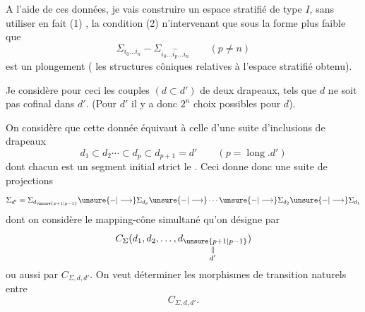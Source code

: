 
A l'aide de ces données, je vais
construire un espace stratifié de type \(I\),
sans utiliser en fait 
(1) , la condition (2) n'intervenant
que sous la forme plus faible que
\[
 \Sigma_{i_0\ldots i_n}
 -\Sigma_{i_0\ldots\widehat{i_p}\ldots i_n}\qquad(p\ne n)
\]
est un plongement 
( les structures côniques
relatives à l'espace stratifié obtenu).

Je considère pour ceci les couples
 \((d\subset d')\) de deux drapeaux,
 tels que
\(d\)  ne soit pas cofinal dans \(d'\).
(Pour \(d'\) 
il y a donc \(2^n\) choix possibles pour \(d\)).


On considère que cette donnée équivaut à celle d'une
suite d'inclusions de drapeaux
\[
 d_1\subset d_2\cdots\subset d_p\subset d_{p+1}=d'
 \qquad(p=\operatorname{long}.d')
\]
dont chacun est un segment initial strict 
le .
Ceci donne donc  une
suite de projections
\[
 \Sigma_{d'}=\Sigma_{d_{\unsure{p+1|p-1}}}\unsure{-|\longrightarrow}\Sigma_{d_p}
 \unsure{-|\longrightarrow}\cdots\unsure{-|\longrightarrow}\Sigma_{d_2}
 \unsure{-|\longrightarrow}\Sigma_{d_1}
\]
dont on considère le mapping-cône simultané
qu'on désigne par
\[
 C_\Sigma(d_1,d_2,\ldots,
 \underset{\substack{\Vert\\d'}}{d_{\unsure{p+1|p-1}}})
\]
ou aussi par \(C_{\Sigma,d,d'}\).
On veut déterminer les
morphismes  de transition naturels entre
\[
 C_{\Sigma,d,d'}.
\]

